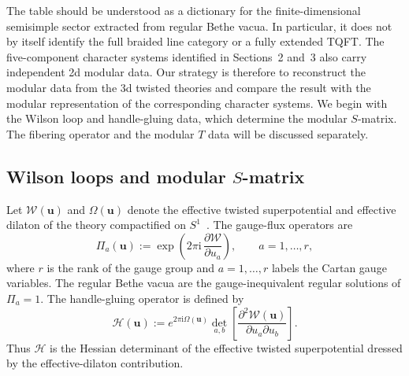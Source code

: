 \documentclass[11pt,a4paper]{article}
\numberwithin{equation}{section}
\begin{document}
The table should be understood as a dictionary for the finite-dimensional semisimple sector extracted from regular Bethe vacua.  In particular, it does not by itself identify the full braided line category or a fully extended TQFT.  The five-component character systems identified in Sections~2 and~3 also carry independent 2d modular data.  Our strategy is therefore to reconstruct the modular data from the 3d twisted theories and compare the result with the modular representation of the corresponding character systems.  We begin with the Wilson loop and handle-gluing data, which determine the modular $S$-matrix.  The fibering operator and the modular $T$ data will be discussed separately.

\subsection{Wilson loops and modular $S$-matrix}
\label{subsec:Wilson-S-matrix}

Let $\mathcal W(\boldsymbol u)$ and $\Omega(\boldsymbol u)$ denote the effective twisted superpotential and effective dilaton of the theory compactified on $S^1$~\cite{NekrasovShatashvili:2015BetheGauge,Closset:2016arn,Closset:2017zgf}.  The gauge-flux operators are
\begin{equation}
  \Pi_a(\boldsymbol u)
  :=\exp\!\left(
  2\pi\mathrm{i}\,
  \frac{\partial\mathcal W}{\partial u_a}
  \right),
  \qquad a=1,\ldots,r,
  \label{eq:general-flux-operator}
\end{equation}
where $r$ is the rank of the gauge group and $a=1,\ldots,r$ labels the Cartan gauge variables.  The regular Bethe vacua are the gauge-inequivalent regular solutions of $\Pi_a=1$.  The handle-gluing operator is defined by~\cite{NekrasovShatashvili:2015BetheGauge,Okuda:2012nx,Okuda:2013fea,Closset:2017zgf}
\begin{equation}
  \mathcal H(\boldsymbol u)
  :=e^{2\pi\mathrm{i}\Omega(\boldsymbol u)}
  \det_{a,b}\!\left[
  \frac{\partial^2\mathcal W(\boldsymbol u)}
  {\partial u_a\partial u_b}
  \right].
  \label{eq:handle-gluing-definition}
\end{equation}
Thus $\mathcal H$ is the Hessian determinant of the effective twisted superpotential dressed by the effective-dilaton contribution.
\end{document}
